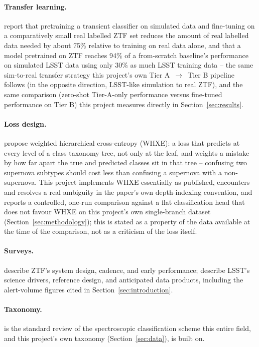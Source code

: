 \paragraph{Transfer learning.}
\citet{guptamuthukrishna2025} report that pretraining a transient classifier
on simulated data and fine-tuning on a comparatively small real labelled
ZTF set reduces the amount of real labelled data needed by about 75\%
relative to training on real data alone, and that a model pretrained on
ZTF reaches 94\% of a from-scratch baseline's performance on simulated LSST
data using only 30\% as much LSST training data -- the same sim-to-real
transfer strategy this project's own Tier A~$\to$~Tier B pipeline follows
(in the opposite direction, LSST-like simulation to real ZTF), and the same
comparison (zero-shot Tier-A-only performance versus fine-tuned performance
on Tier B) this project measures directly in Section~\ref{sec:results}.

\paragraph{Loss design.}
\citet{villar2023whxe} propose weighted hierarchical cross-entropy (WHXE): a
loss that predicts at every level of a class taxonomy tree, not only at the
leaf, and weights a mistake by how far apart the true and predicted classes
sit in that tree -- confusing two supernova subtypes should cost less than
confusing a supernova with a non-supernova. This project implements WHXE
essentially as published, encounters and resolves a real ambiguity in the
paper's own depth-indexing convention, and reports a controlled, one-run
comparison against a flat classification head that does not favour WHXE on
this project's own single-branch dataset (Section~\ref{sec:methodology});
this is stated as a property of the data available at the time of the
comparison, not as a criticism of the loss itself.

\paragraph{Surveys.}
\citet{bellm2019ztf} describe ZTF's system design, cadence, and early
performance; \citet{ivezic2019lsst} describe LSST's science drivers,
reference design, and anticipated data products, including the alert-volume
figures cited in Section~\ref{sec:introduction}.

\paragraph{Taxonomy.}
\citet{filippenko1997} is the standard review of the spectroscopic
classification scheme this entire field, and this project's own taxonomy
(Section~\ref{sec:data}), is built on.

